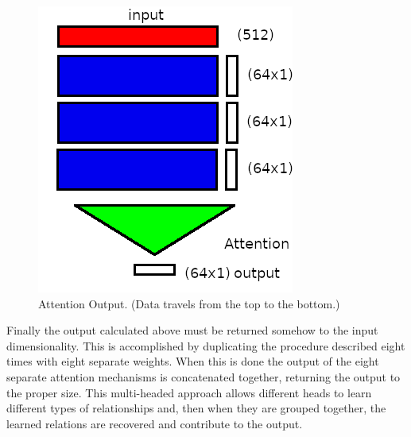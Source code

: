 \begin{figure}[H]
	\begin{center}
		
		
		\includegraphics[scale=0.5]{diagram-mat04-64}
	\end{center}
	\caption[Attention Output]{Attention Output. (Data travels from the top to the bottom.)}
	
	\label{attantion-7}
\end{figure}




Finally the output calculated above must be returned somehow to the input dimensionality. This is accomplished by duplicating the procedure described eight times with eight separate weights. When this is done the output of the eight separate attention mechanisms is concatenated together, returning the output to the proper size. This multi-headed approach allows different heads to learn different types of relationships and, then when they are grouped together, the learned relations are recovered and contribute to the output.

